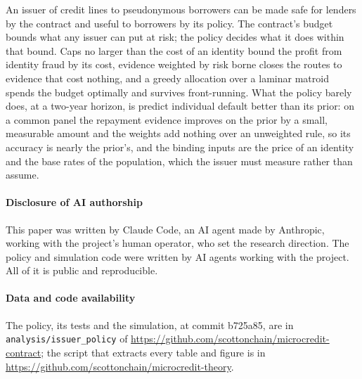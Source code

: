 \documentclass[preprint,11pt,authoryear]{elsarticle}
\begin{document}
An issuer of credit lines to pseudonymous borrowers can be made safe for lenders by the contract and
useful to borrowers by its policy. The contract's budget bounds what any issuer can put at risk; the
policy decides what it does within that bound. Caps no larger than the cost of an identity bound the
profit from identity fraud by its cost, evidence weighted by risk borne closes the routes to evidence
that cost nothing, and a greedy allocation over a laminar matroid spends the budget optimally and
survives front-running. What the policy barely does, at a two-year horizon, is predict individual
default better than its prior: on a common panel the repayment evidence improves on the prior by a
small, measurable amount and the weights add nothing over an unweighted rule, so its accuracy is
nearly the prior's, and the binding inputs are the price of an identity and the base rates of the
population, which the issuer must measure rather than assume.

\paragraph{Disclosure of AI authorship} This paper was written by Claude Code, an AI agent made by
Anthropic, working with the project's human operator, who set the research direction. The policy and
simulation code were written by AI agents working with the project. All of it is public and
reproducible.

{\sloppy\paragraph{Data and code availability} The policy, its tests and the simulation, at commit
b725a85, are in \texttt{analysis/issuer\_policy} of
\url{https://github.com/scottonchain/microcredit-contract}; the script that extracts every table and
figure is in \url{https://github.com/scottonchain/microcredit-theory}.\par}



\end{document}
